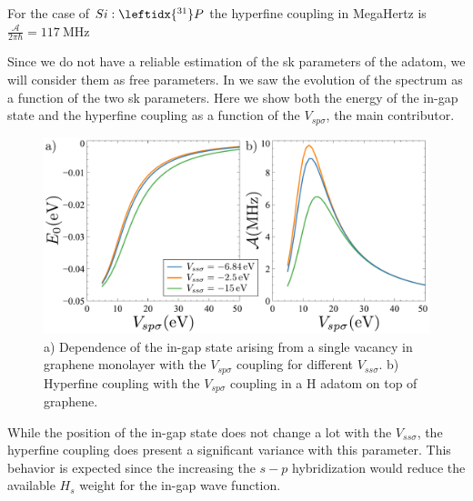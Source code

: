 For the case of $Si:\leftidx{^{31}}P$ the hyperfine coupling in MegaHertz is\cite{Dehollain2014,Kalra2014}
$\frac{\mathcal{A}}{2\pi\hbar} = \SI{117}{\MHz}$


Since we do not have a reliable estimation of the \ac{sk} parameters of the adatom, we will consider them as free parameters. In  we saw the evolution of the spectrum as a function of the two \ac{sk} parameters. Here we show both the energy of the in-gap state and the hyperfine coupling as a function of the $V_{sp\sigma}$, the main contributor.

\begin{figure}[h!]
\centering
\includegraphics{defects/fig/coupling_hyper.pdf}
\vspace{-10pt}
\caption{a) Dependence of the in-gap state arising from a single vacancy in graphene monolayer with the $V_{sp\sigma}$ coupling for different $V_{ss\sigma}$. b) Hyperfine coupling with the $V_{sp\sigma}$ coupling in a H adatom on top of graphene.} %
\label{hyperfine}
\end{figure}
\FloatBarrier

While the position of the in-gap state does not change a lot with the $V_{ss\sigma}$, the hyperfine coupling does present a significant variance with this parameter. This behavior is expected since the increasing the $s-p$ hybridization would reduce the available $H_s$ weight for the in-gap wave function.

